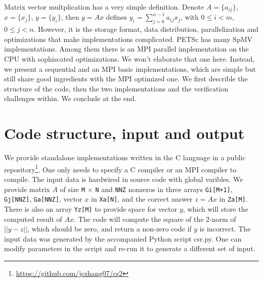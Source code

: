 \documentclass[submission]{eptcs}
\begin{document}
Matrix vector multplication has a very simple definition.
Denote $A = \{a_{ij}\}$, $x = \{x_j\}$, $y = \{y_i\}$, then $y = Ax$ defines
$y_i = \sum_{j=0}^{n-1}a_{ij} x_j$, with $0\leq i < m$, $0 \leq j < n$.
However, it is the storage format, data distribution, parallelization and optimizations
that make implementations complicated.
PETSc has many SpMV implementations.
Among them there is an MPI parallel implementation on the CPU with sophiscated optimizations.
We won't elaborate that one here.
Instead, we present a sequential and an MPI basic implementations, which are simple but still share good
ingredients with the MPI optimized one.
We first describle the structure of the code, then the two implementations and the verification challenges within. We conclude at the end.

\section{Code structure, input and output}
We provide standalone implementations written in the C language in a
public repository\footnote{\url{https://github.com/jczhang07/cs2}}.
One only needs to specify a C compiler or an MPI compiler to compile.
The input data is hardwired in source code with global varibles.
We provide matrix $A$ of size {\tt M} $\times$ {\tt N} and {\tt NNZ} nonzeros in three arrays
{\tt Gi[M+1]}, {\tt Gj[NNZ]}, {\tt Ga[NNZ]},
vector $x$ in {\tt Xa[N]}, and the correct answer $z = Ax$ in {\tt Za[M]}. There is also an array {\tt Yz[M]}
to provide space for vector $y$, which will store the computed result of $Ax$. The code will compute the square of
the 2-norm of $|| y - z ||$, which should be zero, and return a non-zero code if $y$ is incorrect.
The input data was generated by the accompanied Python script csr.py. One can modify parameters in the script and re-run
it to generate a different set of input.
\end{document}
